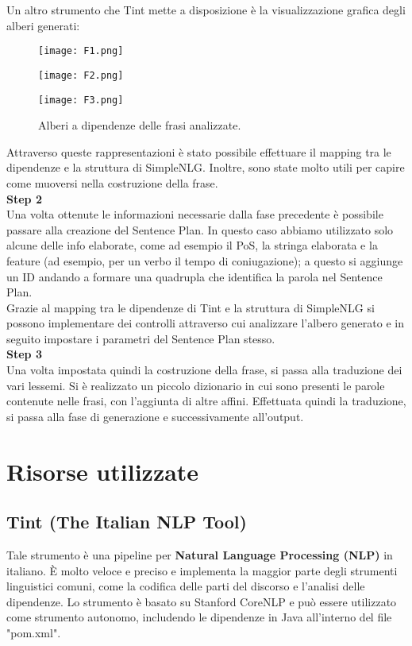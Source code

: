 Un altro strumento che Tint mette a disposizione è la visualizzazione grafica degli alberi generati: 
\begin{figure}[h!]
	\texttt{[image: F1.png]}
	\centering
	\label{fig:ACT}
\end{figure}
\begin{figure}[h!]
	\texttt{[image: F2.png]}
	\centering
	\label{fig:ACT}
\end{figure}
\clearpage
\begin{figure}[h!]
	\texttt{[image: F3.png]}
	\centering
	\caption{Alberi a dipendenze delle frasi analizzate.}
	\label{fig:ACT}
\end{figure}
Attraverso queste rappresentazioni è stato possibile effettuare il mapping tra le dipendenze e la struttura di SimpleNLG. Inoltre, sono state molto utili per capire come muoversi nella costruzione della frase.\\
\textbf{Step 2}\\
Una volta ottenute le informazioni necessarie dalla fase precedente è possibile passare alla creazione del Sentence Plan. In questo caso abbiamo utilizzato solo alcune delle info elaborate, come ad esempio il PoS, la stringa elaborata e la feature (ad esempio, per un verbo il tempo di coniugazione); a questo si aggiunge un ID andando a formare una quadrupla che identifica la parola nel Sentence Plan.\\
Grazie al mapping tra le dipendenze di Tint e la struttura di SimpleNLG si possono implementare dei controlli attraverso cui analizzare l'albero generato e in seguito impostare i parametri del Sentence Plan stesso.\\
\textbf{Step 3}\\
Una volta impostata quindi la costruzione della frase, si passa alla traduzione dei vari lessemi. Si è realizzato un piccolo dizionario in cui sono presenti le parole contenute nelle frasi, con l'aggiunta di altre affini. Effettuata quindi la traduzione, si passa alla fase di generazione e successivamente all'output.
\clearpage

\section{Risorse utilizzate}
\subsection{Tint (The Italian NLP Tool)}
Tale strumento è una pipeline per \textbf{Natural Language Processing (NLP)} in italiano. È molto veloce e preciso e implementa la maggior parte degli strumenti linguistici comuni, come la codifica delle parti del discorso e l'analisi delle dipendenze. Lo strumento è basato su Stanford CoreNLP e può essere utilizzato come strumento autonomo, includendo le dipendenze in  Java all'interno del file "pom.xml".\\
